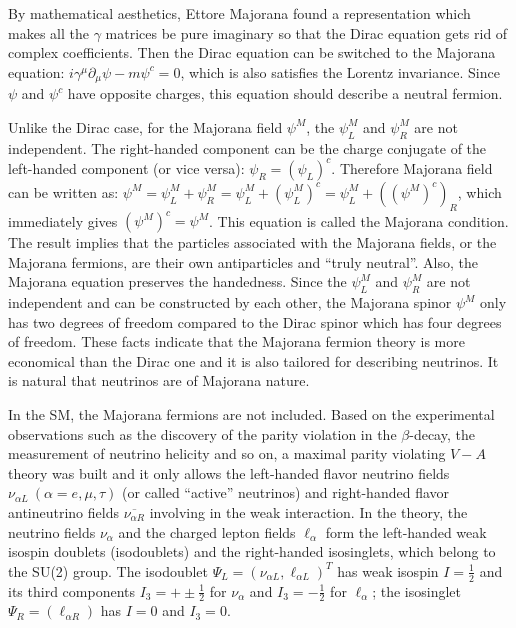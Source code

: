 By mathematical aesthetics, Ettore Majorana found a representation which makes all the $\gamma$ matrices be pure imaginary so that the Dirac equation gets rid of complex coefficients\cite{majorana2006symmetric}. Then the Dirac equation can be switched to the Majorana equation: $i\gamma^\mu\partial_\mu\psi-m\psi^c=0$, which is also satisfies the Lorentz invariance\cite{zee2010quantum}. Since $\psi$ and $\psi^c$ have opposite charges, this equation should describe a neutral fermion\cite{zee2010quantum}. 

Unlike the Dirac case, for the Majorana field $\psi^M$, the $\psi^M_L$ and $\psi^M_R$ are not independent. The right-handed component can be the charge conjugate of the left-handed component (or vice versa): $\psi_R=(\psi_L)^c$\cite{akhmedov2014majorana}. Therefore Majorana field can be written as: $\psi^M=\psi_L^M+\psi_R^M=\psi^M_L+(\psi^M_L)^c=\psi^M_L+((\psi^M)^c)_R$, which immediately gives $(\psi^M)^c=\psi^M$. This equation is called the Majorana condition. The result implies that the particles associated with the Majorana fields, or the Majorana fermions, are their own antiparticles and ``truly neutral''\cite{akhmedov2014majorana}. Also, the Majorana equation preserves the handedness\cite{zee2010quantum}. Since the $\psi^M_L$ and $\psi^M_R$ are not independent and can be constructed by each other, the Majorana spinor $\psi^M$ only has two degrees of freedom compared to the Dirac spinor which has four degrees of freedom. These facts indicate that the Majorana fermion theory is more economical than the Dirac one and it is also tailored for describing neutrinos. It is natural that neutrinos are of Majorana nature.

In the SM, the Majorana fermions are not included. Based on the experimental observations such as the discovery of the parity violation in the $\beta$-decay\cite{wu1957experimental}, the measurement of neutrino helicity\cite{goldhaber1958helicity} and so on, a maximal parity violating $V-A$ theory was built and it only allows the left-handed flavor neutrino fields $\nu_{\alpha L}~(\alpha=e,\mu,\tau)$ (or called ``active'' neutrinos) and right-handed flavor antineutrino fields $\overline{\nu_{\alpha R}}$ involving in the weak interaction. In the theory, the neutrino fields $\nu_\alpha$ and the charged lepton fields $\ell_\alpha$ form the left-handed weak isospin doublets (isodoublets) and the right-handed isosinglets, which belong to the SU(2) group. The isodoublet $\Psi_L = (\nu_{\alpha L}, \ell_{\alpha L})^T$ has weak isospin $I=\frac{1}{2}$ and its third components $I_3=+\pm \frac{1}{2}$ for $\nu_\alpha$ and $I_3=-\frac{1}{2}$ for $\ell_\alpha$; the isosinglet $\Psi_R = (\ell_{\alpha R})$ has $I=0$ and $I_3=0$\cite{aitchison2012gauge, greiner2012theoretical}.


